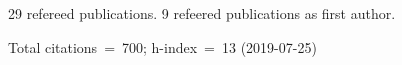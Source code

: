 29 refereed publications. 9 refeered publications as first author.

Total citations~=~700; h-index~=~13 (2019-07-25)